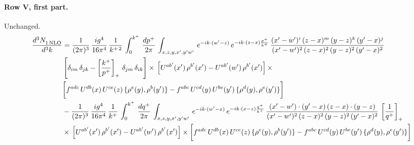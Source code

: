 \documentclass[10pt]{article}
\numberwithin{equation}{section}
\begin{document}
\paragraph{Row V, first part.}
Unchanged.
\begin{align}
     \frac{d^{3}N_{1\,\rm NLO}^{\rm}}{d^{3}k}  & =  \frac{1}{(2\pi)^{3}}\, \frac{ig^{4}}{16\pi^{4}}\, \frac{1}{k^{+\,2}}\,\int_{0}^{k^{+}}\, \frac{dp^{+}}{2\pi}\,\int_{x,z,y,x',y'w'}\,e^{-ik\cdot (w^\prime-z)}\,e^{-ik\cdot (z-x)\frac{p^{+}}{k^{+}}}\,\frac{(x'-w')^{i}\,(z-x)^{m}\,(y-z)^{k}\,(y'-x)^{j}}{(x'-w')^{2}\,(z-x)^{2}\,(y-z)^{2}\,(y'-x)^{2}}\,\notag \\ & \left[\delta_{im}\,\delta_{jk}-\left[\frac{k^{+}}{p^{+}}\right]_{+}\, \delta_{jm}\,\delta_{ik}\right]\times\, \left[U^{ab'}(x')\,\rho^{b'}(x')-U^{ab'}(w')\,\rho^{b'}(x')\right]\times\notag \\ & \bigg[f^{adc}\,U^{db}(x)\,U^{ce}(z)\, \{\rho^{e}(y),\rho^{b}(y')\}-f^{abc}\,U^{cd}(y)\,U^{be}(y')\, \{\rho^{d}(y),\rho^{e}(y')\}\bigg] \notag \\
& -\frac{1}{(2\pi)^{3}}\, \frac{ig^{4}}{16\pi^{4}}\, \frac{1}{k^{+}}\,\int_{0}^{k^{+}}\, \frac{dq^{+}}{2\pi}\,\int_{x,z,y,x',y'w'}\,e^{-ik\cdot (w^\prime-x)}\,e^{-ik\cdot (x-z)\frac{q^{+}}{k^{+}}}\,\frac{(x'-w')\cdot (y'-x)\,(z-x)\cdot (y-z)}{(x'-w')^{2}\,(z-x)^{2}\,(y-z)^{2}\,(y'-x)^{2}}\,\left[\frac{1}{q^{+}}\right]_{+}\notag \\ & \times\, \left[U^{ab'}(x')\,\rho^{b'}(x')-U^{ab'}(w')\,\rho^{b'}(x')\right]\times \bigg[f^{adc}\,U^{db}(x)\,U^{ce}(z)\, \{\rho^{e}(y),\rho^{b}(y')\}-f^{abc}\,U^{cd}(y)\,U^{be}(y')\, \{\rho^{d}(y),\rho^{e}(y')\}\bigg] \label{eq:F:G1V1}
\end{align}
\end{document}

